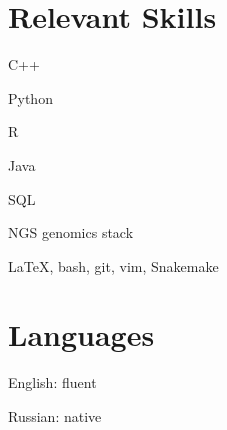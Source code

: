\section{Relevant Skills}
\vspace*{-.4cm}
\begin{innerlist}
  \item C++
  \item Python
  \item R
  \item Java
  \item SQL %
  \item NGS genomics stack
  \item \LaTeX, bash, git, vim, Snakemake
\end{innerlist}

\section{Languages}
\vspace*{-.4cm}
\begin{innerlist}
  \item English: fluent
  \item Russian: native
\end{innerlist}
